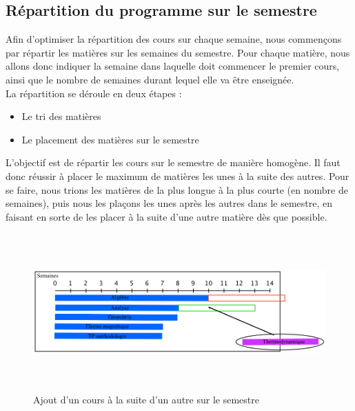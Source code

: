 \subsection{Répartition du programme sur le semestre}

Afin d'optimiser la répartition des cours sur chaque semaine, nous commençons par répartir les matières sur les semaines du semestre. Pour chaque matière, nous allons donc indiquer la semaine dans laquelle doit commencer le premier cours, ainsi que le nombre de semaines durant lequel elle va être enseignée.\\

La répartition se déroule en deux étapes : 
\begin{itemize}
\item Le tri des matières 
\item Le placement des matières sur le semestre\\
\end{itemize}

L'objectif est de répartir les cours sur le semestre de manière homogène. Il faut donc réussir à placer le maximum de matières les unes à la suite des autres. Pour se faire, nous trions les matières de la plus longue à la plus courte (en nombre de semaines), puis nous les plaçons les unes après les autres dans le semestre, en faisant en sorte de les placer à la suite d'une autre matière dès que possible.

\newpage

\begin{figure}[! ht ]
    \centering
    \begin{minipage}[t]{14 cm}
        \centering
            \includegraphics [width=160mm, height=60mm]{RepartitionSemestre2.png}
        \caption {Ajout d'un cours à la suite d'un autre sur le semestre}
    \end{minipage}
\end{figure}

